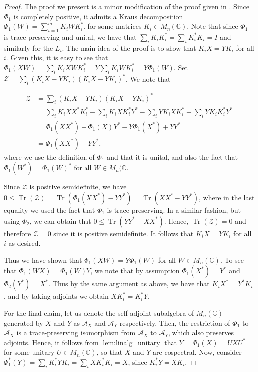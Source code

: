\documentclass[11pt,a4paper]{article}
\theoremstyle{plain}
\theoremstyle{remark}
\theoremstyle{definition}
\DeclareMathOperator{\tr}{Tr}
\def\calA{{\mathcal A}} \def\calB{{\mathcal B}} \def\calC{{\mathcal C}}
\begin{document}
\begin{proof}
    The proof we present is a minor modification of the proof given in \cite[lemma 4.10]{david_mathprog}. Since $\Phi_1$ is completely positive, it admits a Kraus decomposition $\Phi_1(W) = \sum_{i=1}^m K_i W K_i^{*}$, for some matrices $K_i \in M_n(\mathbb{C})$. Note that since $\Phi_1$ is trace-preserving and unital, we have that $\sum_{i}K_iK_i^* = \sum_{i}K_i^*K_i = I$ and similarly for the $L_i$. The main idea of the proof is to show that $K_i X = YK_i$ for all $i$. Given this, it is easy to see that $\Phi_1(XW) = \sum_{i}K_i XW K_i^* = Y \sum_{i}K_iW K_i^* = Y \Phi_1(W)$. Set $\mathcal{Z} = \sum_{i} (K_i X - YK_i)(K_iX - YK_i)^*$. We note that 

    \begin{align*}
        \mathcal{Z} & = \sum_{i} (K_i X - YK_i)(K_iX - YK_i)^* \\
        & = \sum_i K_i XX^* K_i^* - \sum_i K_i X K_i^* Y^* - \sum_i Y K_i X K_i^* + \sum_i Y K_iK_i^* Y^* \\
        & = \Phi_1(XX^*) - \Phi_1(X)Y^* - Y \Phi_1(X^*) + YY^* \\
        & = \Phi_1(XX^*) - YY^*, 
    \end{align*}
    where we use the definition of $\Phi_1$ and that it is unital, and also the fact that $\Phi_1(W^*) = \Phi_1(W)^*$ for all $W \in M_n(\mathbb{C}$. 
    
    Since $\mathcal{Z}$ is positive semidefinite, we have $0 \leq \tr(\mathcal{Z}) = \tr(\Phi_1(XX^*) - YY^*) = \tr(XX^* - YY^*)$, where in the last equality we used the fact that $\Phi_1$ is trace preserving. In a similar fashion, but using $\Phi_2$, we can obtain that $0 \le \tr(YY^* - XX^*)$. Hence, $\tr(\mathcal{Z}) = 0$ and therefore $\mathcal{Z} = 0$ since it is positive semidefinite. It follows that $K_iX = YK_i$ for all $i$ as desired.

    Thus we have shown that $\Phi_1(XW) = Y\Phi_1(W)$ for all $W \in M_n(\mathbb{C})$. To see that $\Phi_1(WX) = \Phi_1(W)Y$, we note that by assumption $\Phi_1(X^*) = Y^*$ and $\Phi_2(Y^*) = X^*$. Thus by the same argument as above, we have that $K_iX^* = Y^*K_i$, and by taking adjoints we obtain $XK_i^* = K_i^*Y$.
    


    For the final claim, let us denote the self-adjoint subalgebra of $M_n(\mathbb{C})$ generated by $X$ and $Y$ as $\calA_X$ and $\calA_Y$ respectively. Then, the restriction of $\Phi_1$ to $\calA_X$ is a trace-preserving isomorphism from $\calA_X$ to $\calA_Y$, which also preserves adjoints. Hence, it follows from \cref{lem:linalg_unitary} that $Y = \Phi_1(X) = UXU^*$ for some unitary $U \in M_n(\mathbb{C})$, so that $X$ and $Y$ are cospectral. Now, consider $\Phi_1^*(Y) = \sum_i K_i^* Y K_i =  \sum_i  X K_i^* K_i = X$, since $K_i^* Y = X K_i$. 
\end{proof}
\end{document}
